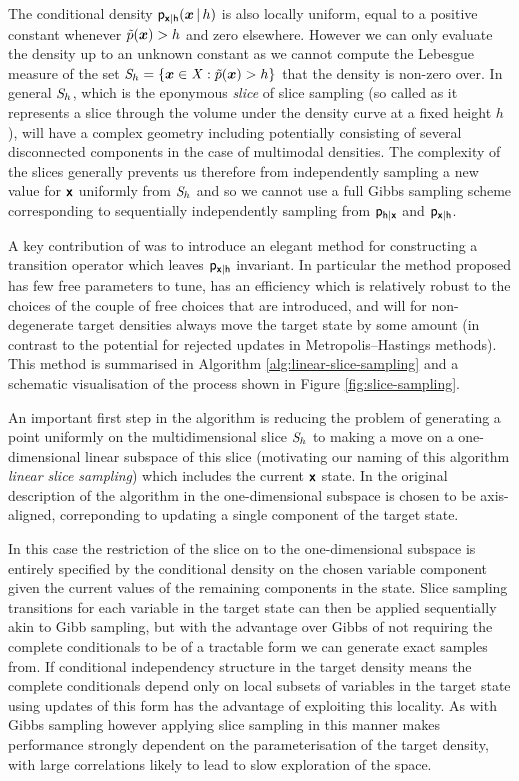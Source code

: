 The conditional density $\mathsf{p}_{\boldsymbol{\mathsf{x}}|\mathsf{h}}(\boldsymbol{x}\operatorname{|} h)$ is also locally uniform, equal to a positive constant whenever $\tilde{p}(\boldsymbol{x}) > h$ and zero elsewhere. However we can only evaluate the density up to an unknown constant as we cannot compute the Lebesgue measure of the set $\set{S}_h = \fset{\vct{x} \in \set{X} : \utgtdens(\vct{x}) > h}$ that the density is non-zero over. In general $\mathit{S}_h$, which is the eponymous \emph{slice} of slice sampling (so called as it represents a slice through the volume under the density curve at a fixed height $h$), will have a complex geometry including potentially consisting of several disconnected components in the case of multimodal densities. The complexity of the slices generally prevents us therefore from independently sampling a new value for $\boldsymbol{\mathsf{x}}$ uniformly from $\mathit{S}_h$ and so we cannot use a full Gibbs sampling scheme corresponding to sequentially independently sampling from $\mathsf{p}_{\mathsf{h}|\boldsymbol{\mathsf{x}}}$ and $\mathsf{p}_{\boldsymbol{\mathsf{x}}|\mathsf{h}}$.

A key contribution of \citep{neal2003slice} was to introduce an elegant method for constructing a transition operator which leaves $\mathsf{p}_{\boldsymbol{\mathsf{x}}|\mathsf{h}}$ invariant. In particular the method proposed has few free parameters to tune, has an efficiency which is relatively robust to the choices of the couple of free choices that are introduced, and will for non-degenerate target densities always move the target state by some amount (in contrast to the potential for rejected updates in Metropolis--Hastings methods). This method is summarised in Algorithm \ref{alg:linear-slice-sampling} and a schematic visualisation of the process shown in Figure \ref{fig:slice-sampling}.

An important first step in the algorithm is reducing the problem of generating a point uniformly on the multidimensional slice $\mathit{S}_h$ to making a move on a one-dimensional linear subspace of this slice  (motivating our naming of this algorithm \emph{linear slice sampling}) which includes the current $\boldsymbol{\mathsf{x}}$ state. In the original description of the algorithm in \citep{neal2003slice} the one-dimensional subspace is chosen to be axis-aligned, correponding to updating a single component of the target state. 

In this case the restriction of the slice on to the one-dimensional subspace is entirely specified by the conditional density on the chosen variable component given the current values of the remaining components in the state. Slice sampling transitions for each variable in the target state can then be applied sequentially akin to Gibb sampling, but with the advantage over Gibbs of not requiring the complete conditionals to be of a tractable form we can generate exact samples from. If conditional independency structure in the target density means the complete conditionals depend only on local subsets of variables in the target state using updates of this form has the advantage of exploiting this locality. As with Gibbs sampling however applying slice sampling in this manner makes performance strongly dependent on the parameterisation of the target density, with large correlations likely to lead to slow exploration of the space. 

